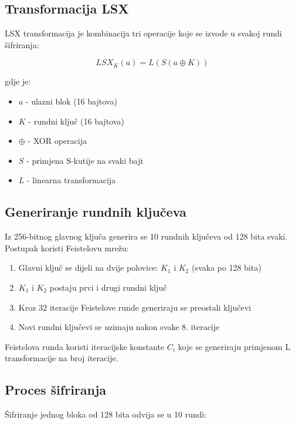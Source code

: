 \documentclass[12pt,a4paper]{article}
\begin{document}
\subsection{Transformacija LSX}

LSX transformacija je kombinacija tri operacije koje se izvode u svakoj rundi šifriranja:

\begin{equation}
    LSX_K(a) = L(S(a \oplus K))
\end{equation}

gdje je:
\begin{itemize}
    \item $a$ - ulazni blok (16 bajtova)
    \item $K$ - rundni ključ (16 bajtova)
    \item $\oplus$ - XOR operacija
    \item $S$ - primjena S-kutije na svaki bajt
    \item $L$ - linearna transformacija
\end{itemize}

\subsection{Generiranje rundnih ključeva}

Iz 256-bitnog glavnog ključa generira se 10 rundnih ključeva od 128 bita svaki. Postupak koristi Feistelovu mrežu:

\begin{enumerate}
    \item Glavni ključ se dijeli na dvije polovice: $K_1$ i $K_2$ (svaka po 128 bita)
    \item $K_1$ i $K_2$ postaju prvi i drugi rundni ključ
    \item Kroz 32 iteracije Feistelove runde generiraju se preostali ključevi
    \item Novi rundni ključevi se uzimaju nakon svake 8. iteracije
\end{enumerate}

Feistelova runda koristi iteracijske konstante $C_i$ koje se generiraju primjenom L transformacije na broj iteracije.

\newpage
\subsection{Proces šifriranja}

Šifriranje jednog bloka od 128 bita odvija se u 10 rundi:
\end{document}
